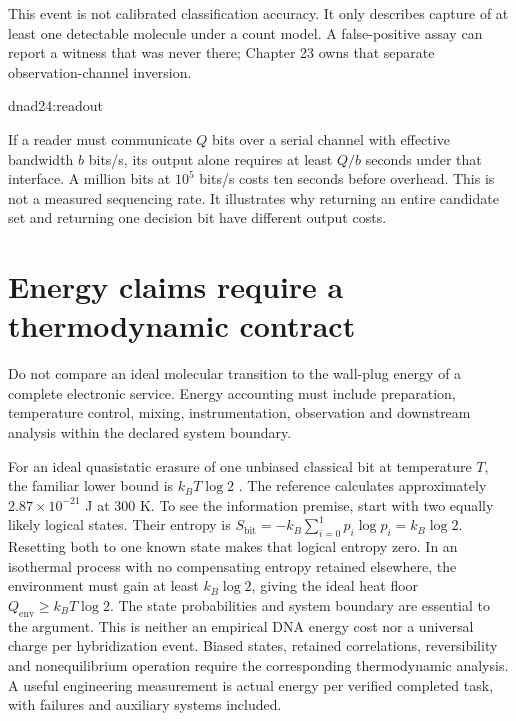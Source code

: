 This event is not calibrated classification accuracy. It only describes capture
of at least one detectable molecule under a count model. A false-positive assay
can report a witness that was never there; Chapter 23 owns that separate
observation-channel inversion.

{dnad24:readout}

If a reader must communicate $Q$ bits over a serial channel with effective
bandwidth $b$ bits/s, its output alone requires at least $Q/b$ seconds under that
interface. A million bits at $10^5$ bits/s costs ten seconds before overhead.
This is not a measured sequencing rate. It illustrates why returning an entire
candidate set and returning one decision bit have different output costs.

\section{Energy claims require a thermodynamic contract}
Do not compare an ideal molecular transition to the wall-plug energy of a complete
electronic service. Energy accounting must include preparation, temperature
control, mixing, instrumentation, observation and downstream analysis within the
declared system boundary.

For an ideal quasistatic erasure of one unbiased classical bit at temperature
$T$, the familiar lower bound is $k_BT\log2$ \cite{Landauer1961}.
The reference calculates approximately $2.87\times10^{-21}$ J at 300 K.
To see the information premise, start with two equally likely logical states.
Their entropy is $S_{\mathrm{bit}}=-k_B\sum_{i=0}^1p_i\log p_i=k_B\log2$.
Resetting both to one known state makes that logical entropy zero. In an
isothermal process with no compensating entropy retained elsewhere, the
environment must gain at least $k_B\log2$, giving the ideal heat floor
$Q_{\mathrm{env}}\ge k_BT\log2$. The state probabilities and system boundary
are essential to the argument.
This is neither an empirical DNA energy cost nor a universal charge per hybridization
event. Biased states, retained correlations, reversibility and nonequilibrium
operation require the corresponding thermodynamic analysis. A useful engineering
measurement is actual energy per verified completed task, with failures and
auxiliary systems included.

